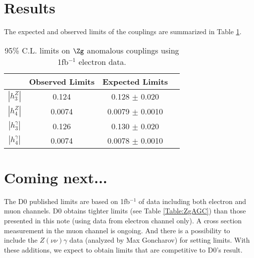 \documentclass[12pt,twoside,letterpaper]{article}
\begin{document}
\section{Results}
The expected and observed limits of the couplings are summarized in
Table \ref{Table:ZgAGC1fbEle}.
    \begin{table}[!hbtp]
    \begin{center}
    \begin{tabular}{|c|c|c|c|}
 \hline
                             & Observed Limits          &Expected Limits                           \\
 \hline                                                                      
           $|h_3^Z|$         &  0.124                   &   0.128 $\pm$ 0.020                      \\
           $|h_4^Z|$         &  0.0074                  &   0.0079 $\pm$ 0.0010                    \\
 \hline                                                                      
           $|h_3^{\gamma}|$  &  0.126                   &   0.130 $\pm$ 0.020                                   \\
           $|h_4^{\gamma}|$  &  0.0074                  &   0.0078 $\pm$ 0.0010                               \\
 \hline
    \end{tabular}
     \caption{95\% C.L. limits on $\Zg$ anomalous couplings using 1fb$^{-1}$ electron data.}
     \label{Table:ZgAGC1fbEle}
    \end{center}
    \end{table}

\section{Coming next...}
The D0 published limits are based on 1fb$^{-1}$ of data including both
electron and muon channels. D0 obtains tighter limits (see Table \ref{Table:ZgAGC}) than those
presented in this note (using data from electron channel only). 
A \Zg cross section measurement in the muon channel is ongoing. And
there is a possibility to include the $Z(\nu\nu)\gamma$ data (analyzed
by Max Goncharov) for setting limits. With
these additions, we expect to obtain limits that are competitive to D0's
result. 
\end{document}
